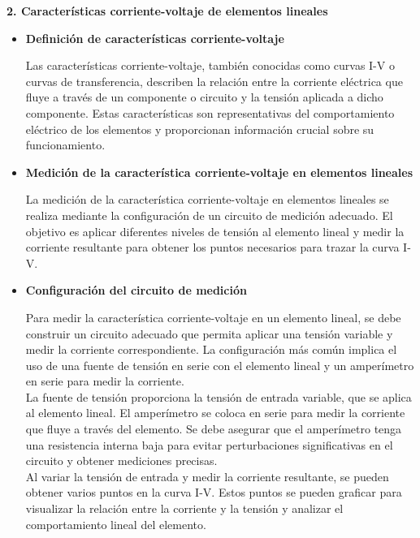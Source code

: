 \documentclass[12pt]{article}
\begin{document}
	
	
	\textbf{2. Características corriente-voltaje de elementos lineales}\\
	
	\begin{itemize}
		\item \textbf{Definición de características corriente-voltaje}
		
		Las características corriente-voltaje, también conocidas como curvas I-V o curvas de transferencia, describen la relación entre la corriente eléctrica que fluye a través de un componente o circuito y la tensión aplicada a dicho componente. Estas características son representativas del comportamiento eléctrico de los elementos y proporcionan información crucial sobre su funcionamiento.
		
		\item \textbf{Medición de la característica corriente-voltaje en elementos lineales}
		
		La medición de la característica corriente-voltaje en elementos lineales se realiza mediante la configuración de un circuito de medición adecuado. El objetivo es aplicar diferentes niveles de tensión al elemento lineal y medir la corriente resultante para obtener los puntos necesarios para trazar la curva I-V.
		
		\item \textbf{Configuración del circuito de medición}
		
		Para medir la característica corriente-voltaje en un elemento lineal, se debe construir un circuito adecuado que permita aplicar una tensión variable y medir la corriente correspondiente. La configuración más común implica el uso de una fuente de tensión en serie con el elemento lineal y un amperímetro en serie para medir la corriente.\\
		
		La fuente de tensión proporciona la tensión de entrada variable, que se aplica al elemento lineal. El amperímetro se coloca en serie para medir la corriente que fluye a través del elemento. Se debe asegurar que el amperímetro tenga una resistencia interna baja para evitar perturbaciones significativas en el circuito y obtener mediciones precisas.\\
		
		Al variar la tensión de entrada y medir la corriente resultante, se pueden obtener varios puntos en la curva I-V. Estos puntos se pueden graficar para visualizar la relación entre la corriente y la tensión y analizar el comportamiento lineal del elemento. 
	\end{itemize}
	
\end{document}
